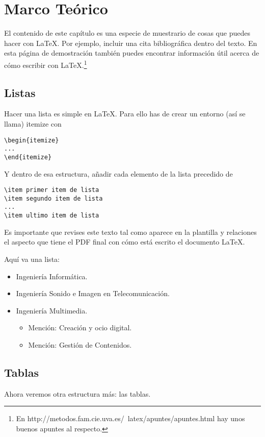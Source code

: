\chapter{Marco Teórico}
\label{marcoteorico}

El contenido de este capítulo es una especie de muestrario de cosas que puedes hacer con \LaTeX.  Por ejemplo, incluir una cita bibliográfica   \cite{BOE_IM_UA} dentro del texto. En esta página de demostración también puedes encontrar información útil acerca de cómo escribir con  \LaTeX.\footnote{En http://metodos.fam.cie.uva.es/~latex/apuntes/apuntes.html hay unos buenos apuntes al respecto.}
\section{Listas}
Hacer una lista es simple en \LaTeX. Para ello has de crear un entorno (así se llama) itemize con
\begin{verbatim}
\begin{itemize}
...
\end{itemize}
\end{verbatim}
Y dentro de esa estructura, añadir cada elemento de la lista precedido de 
\begin{verbatim}
\item primer item de lista
\item segundo item de lista
...
\item ultimo item de lista
\end{verbatim}

Es importante que revises este texto tal como aparece en la plantilla y relaciones el aspecto que tiene el PDF final con cómo está escrito el documento \LaTeX.

Aquí va una lista:
\begin{itemize}
    \item Ingeniería Informática.
    \item Ingeniería Sonido e Imagen en Telecomunicación.
    \item Ingeniería Multimedia.
    \begin{itemize}
         \item Mención: Creación y ocio digital.
         \item Mención: Gestión de Contenidos.
    \end{itemize}
\end{itemize}


\section{Tablas}
Ahora veremos otra estructura más: las tablas.

